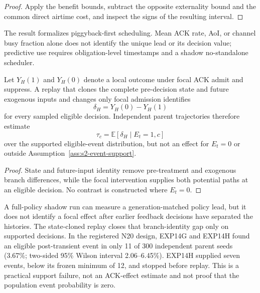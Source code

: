 \begin{proof}
Apply the benefit bounds, subtract the opposite externality bound and the
common direct airtime cost, and inspect the signs of the resulting interval.
\end{proof}

The result formalizes piggyback-first scheduling.  Mean ACK rate, AoI, or
channel busy fraction alone does not identify the unique lead or its decision
value; predictive use requires obligation-level timestamps and a shadow
no-standalone scheduler.

\begin{proposition}
Let $Y_H(1)$ and $Y_H(0)$ denote a local outcome under focal ACK admit and
suppress.  A replay that clones the complete pre-decision state and future
exogenous inputs and changes only focal admission identifies
\begin{equation}
\delta_H=Y_H(0)-Y_H(1)
\end{equation}
for every sampled eligible decision.  Independent parent trajectories
therefore estimate
\begin{equation}
\tau_c=\mathbb E[\delta_H\mid E_t=1,c]
\end{equation}
over the supported eligible-event distribution, but not an effect for
$E_t=0$ or outside Assumption~\ref{ass:s2-event-support}.
\label{prop:s2-branch-identification}
\end{proposition}

\begin{proof}
State and future-input identity remove pre-treatment and exogenous branch
differences, while the focal intervention supplies both potential paths at an
eligible decision.  No contrast is constructed where $E_t=0$.
\end{proof}

A full-policy shadow run can measure a generation-matched policy lead, but it
does not identify a focal effect after earlier feedback decisions have
separated the histories.  The state-cloned replay closes that branch-identity
gap only on supported decisions.  In the registered N20 design, EXP14G and
EXP14H found an eligible post-transient event in only 11 of 300 independent
parent seeds (3.67\%; two-sided 95\% Wilson interval 2.06--6.45\%).
EXP14H supplied seven events, below its frozen minimum of 12, and stopped
before replay.  This is a practical support failure, not an ACK-effect
estimate and not proof that the population event probability is zero.

